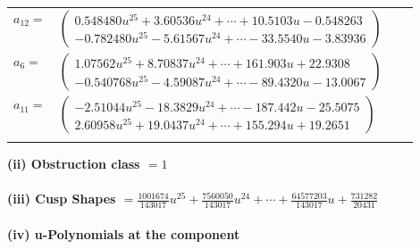 \documentclass[1p]{elsarticle_modified}
\theoremstyle{definition}
\begin{document}
\begin{tabular}{m{7pt} m{180pt} m{7pt} m{180pt} }
\flushright $a_{12}=$&$\begin{pmatrix}0.548480 u^{25}+3.60536 u^{24}+\cdots+10.5103 u-0.548263\\-0.782480 u^{25}-5.61567 u^{24}+\cdots-33.5540 u-3.83936\end{pmatrix}$ \\
\flushright $a_{6}=$&$\begin{pmatrix}1.07562 u^{25}+8.70837 u^{24}+\cdots+161.903 u+22.9308\\-0.540768 u^{25}-4.59087 u^{24}+\cdots-89.4320 u-13.0067\end{pmatrix}$ \\
\flushright $a_{11}=$&$\begin{pmatrix}-2.51044 u^{25}-18.3829 u^{24}+\cdots-187.442 u-25.5075\\2.60958 u^{25}+19.0437 u^{24}+\cdots+155.294 u+19.2651\end{pmatrix}$\\&\end{tabular}
\flushleft \textbf{(ii) Obstruction class $= 1$}\\~\\
\flushleft \textbf{(iii) Cusp Shapes $= \frac{1001674}{143017} u^{25}+\frac{7560050}{143017} u^{24}+\cdots+\frac{64577203}{143017} u+\frac{731282}{20431}$}\\~\\
\newpage\renewcommand{\arraystretch}{1}
\flushleft \textbf{(iv) u-Polynomials at the component}\newline \\
\end{document}

